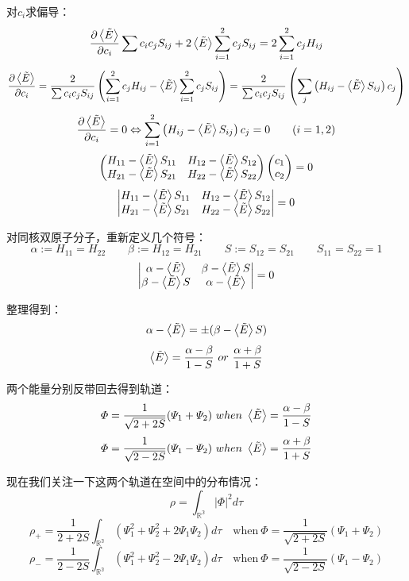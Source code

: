 对$c_i$求偏导：
\[\frac{\partial \expval{\tilde{E}}}{\partial c_i}\sum c_ic_jS_{ij}+2\expval{\tilde{E}}\sum_{i=1}^2 c_jS_{ij}=2\sum_{i=1}^2 c_jH_{ij}\]
\[\frac{\partial \expval{\tilde{E}}}{\partial c_i}=\frac{2}{\sum c_ic_jS_{ij}}\left(\sum_{i=1}^2 c_jH_{ij}-\expval{\tilde{E}}\sum_{i=1}^2 c_jS_{ij}\right)=\frac{2}{\sum c_ic_jS_{ij}}\left(\sum_j \left (H_{ij}-\expval{\tilde{E}}S_{ij}\right )c_j\right)\]
\[\frac{\partial \expval{\tilde{E}}}{\partial c_i}=0 \Leftrightarrow \sum_{i=1}^2 \left (H_{ij}-\expval{\tilde{E}}S_{ij}\right )c_j=0 \qquad (i=1,2)\]
\[
\begin{pmatrix}
H_{11}-\expval{\tilde{E}}S_{11} & H_{12}-\expval{\tilde{E}}S_{12} \\
H_{21}-\expval{\tilde{E}}S_{21} & H_{22}-\expval{\tilde{E}}S_{22} \\
\end{pmatrix}
\begin{pmatrix}
c_1\\
c_2
\end{pmatrix}
=0
\]
\[
    \begin{vmatrix}
        H_{11}-\expval{\tilde{E}}S_{11} & H_{12}-\expval{\tilde{E}}S_{12} \\
        H_{21}-\expval{\tilde{E}}S_{21} & H_{22}-\expval{\tilde{E}}S_{22} \\
    \end{vmatrix}
    =0
\]

对同核双原子分子，重新定义几个符号：
\[\alpha:=H_{11}=H_{22} \qquad \beta:=H_{12}=H_{21} \qquad S:=S_{12}=S_{21} \qquad S_{11}=S_{22}=1\]
\[
    \begin{vmatrix}
        \alpha-\expval{\tilde{E}} & \beta-\expval{\tilde{E}}S \\
        \beta-\expval{\tilde{E}}S & \alpha-\expval{\tilde{E}} \\
    \end{vmatrix}
    =0
\]

整理得到：
\[\alpha-\expval{\tilde{E}}=\pm (\beta-\expval{\tilde{E}}S)\]
\[\expval{\tilde{E}}=\frac{\alpha-\beta}{1-S} \ or \ \frac{\alpha+\beta}{1+S}\]

两个能量分别反带回去得到轨道：
\[\varPhi=\frac{1}{\sqrt{2+2S}}(\varPsi_1+\varPsi_2) \ when \ \expval{\tilde{E}}=\frac{\alpha-\beta}{1-S}\] 
\[\varPhi=\frac{1}{\sqrt{2-2S}}(\varPsi_1-\varPsi_2) \ when \ \expval{\tilde{E}}=\frac{\alpha+\beta}{1+S}\]

现在我们关注一下这两个轨道在空间中的分布情况：
\[\rho=\int_{\mathbb{R^3}}|\varPhi|^2d\tau\]
\[\rho_+=\frac{1}{2+2S}\int_{\mathbb{R^3}}\left(\varPsi_1^2+\varPsi_2^2+2\varPsi_1\varPsi_2\right) d\tau\quad \text{when} \ \varPhi=\frac{1}{\sqrt{2+2S}}(\varPsi_1+\varPsi_2)\] 
\[\rho_-=\frac{1}{2-2S}\int_{\mathbb{R^3}}\left(\varPsi_1^2+\varPsi_2^2-2\varPsi_1\varPsi_2\right) d\tau\quad \text{when} \ \varPhi=\frac{1}{\sqrt{2-2S}}(\varPsi_1-\varPsi_2)\]

